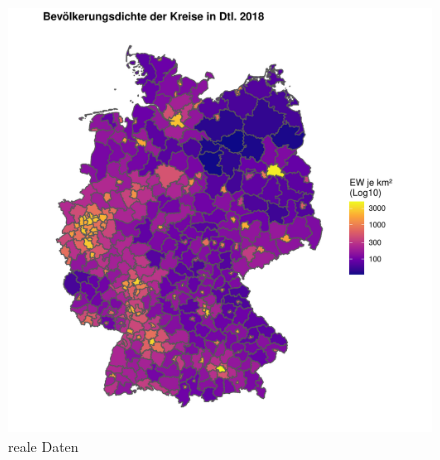 \begin{figure}[htb] %
    \centering %
    \begin{minipage}[b]{.45\linewidth} %
        \includegraphics[width=\linewidth,trim={2cm 1cm 1cm 1cm},clip]{body/figures/popdens2018.pdf} %
       \caption{reale Daten}
    \end{minipage} %
    \hfill
    \begin{minipage}[b]{.45\linewidth}

\end{minipage}
\end{figure}
